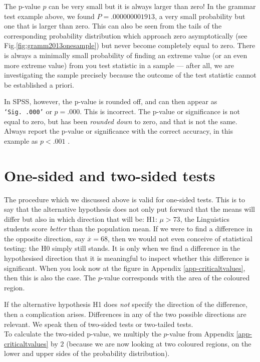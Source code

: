 \documentclass[
]{book}
\begin{document}
The p-value \(p\) can be very small but it is always larger than zero!
In the grammar test example above,
we found \(P=.000000001913\), a very small probability but one that is larger
than zero. This can also be seen from the tails of the corresponding
probability distribution which approach zero asymptotically (see
Fig.\ref{fig:gramm2013onesample}) but never become completely equal
to zero. There is always a minimally small probability of finding
an extreme value (or an even more extreme value) from you test statistic
in a sample --- after all, we are investigating the sample precisely
because the outcome of the test statistic cannot be established a priori.

In SPSS, however, the p-value is rounded off, and can then appear as
\texttt{‘Sig.\ .000’} or \(p=.000\). This is incorrect.
The p-value or significance is not equal to zero, but has
been \emph{rounded down} to zero, and that is not the same.
Always report the p-value or significance with the correct
accuracy, in this example as \(p<.001\) \citep[p.125]{Wright03}.

\section{One-sided and two-sided tests}\label{sec:ttest-onesidedtwosided}

The procedure which we discussed above is valid for one-sided
tests. This is to say that the alternative hypothesis does not only put forward
that the means will differ but also in which direction that will be:
H1: \(\mu >73\), the Linguistics students score \emph{better} than the population
mean. If we were to find a difference in the opposite direction,
say \(\overline{x}=68\), then we would not even conceive of statistical testing:
the H0 simply still stands. It is only when we find a difference
in the hypothesised direction that it is meaningful to inspect whether
this difference is significant. When you look now at the figure in
Appendix \ref{app-criticaltvalues}, then this is also the case. The \(p\)-value
corresponds with the area of the coloured region.

If the alternative hypothesis H1 does \emph{not} specify the direction of the
difference, then a complication arises. Differences in any of the two possible directions
are relevant. We speak then of two-sided tests or two-tailed tests.\\
To calculate the two-sided p-value, we multiply the \(p\)-value from
Appendix \ref{app-criticaltvalues} by \(2\) (because we are now looking at two
coloured regions, on the lower and upper sides of the probability distribution).
\end{document}
